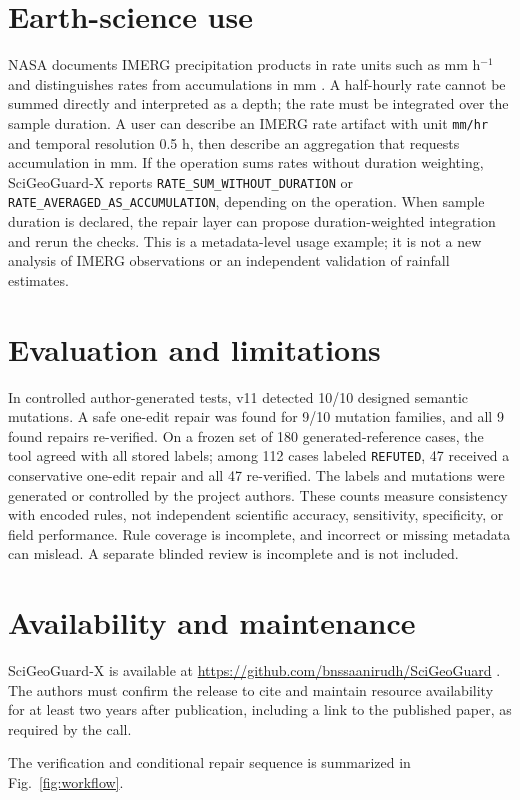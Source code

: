 \documentclass[review]{fcs}
\begin{document}
\section{Earth-science use}
NASA documents IMERG precipitation products in rate units such as mm h$^{-1}$ and distinguishes rates from accumulations in mm \cite{imerg}. A half-hourly rate cannot be summed directly and interpreted as a depth; the rate must be integrated over the sample duration. A user can describe an IMERG rate artifact with unit \texttt{mm/hr} and temporal resolution 0.5 h, then describe an aggregation that requests accumulation in mm. If the operation sums rates without duration weighting, SciGeoGuard-X reports \texttt{RATE\_SUM\_WITHOUT\_DURATION} or \texttt{RATE\_AVERAGED\_AS\_ACCUMULATION}, depending on the operation. When sample duration is declared, the repair layer can propose duration-weighted integration and rerun the checks. This is a metadata-level usage example; it is not a new analysis of IMERG observations or an independent validation of rainfall estimates.

\section{Evaluation and limitations}
In controlled author-generated tests, v11 detected 10/10 designed semantic mutations. A safe one-edit repair was found for 9/10 mutation families, and all 9 found repairs re-verified. On a frozen set of 180 generated-reference cases, the tool agreed with all stored labels; among 112 cases labeled \texttt{REFUTED}, 47 received a conservative one-edit repair and all 47 re-verified. The labels and mutations were generated or controlled by the project authors. These counts measure consistency with encoded rules, not independent scientific accuracy, sensitivity, specificity, or field performance. Rule coverage is incomplete, and incorrect or missing metadata can mislead. A separate blinded review is incomplete and is not included.

\section{Availability and maintenance}
SciGeoGuard-X is available at \url{https://github.com/bnssaanirudh/SciGeoGuard} \cite{sgg}. The authors must confirm the release to cite and maintain resource availability for at least two years after publication, including a link to the published paper, as required by the call.

The verification and conditional repair sequence is summarized in Fig.~\ref{fig:workflow}.
\end{document}

